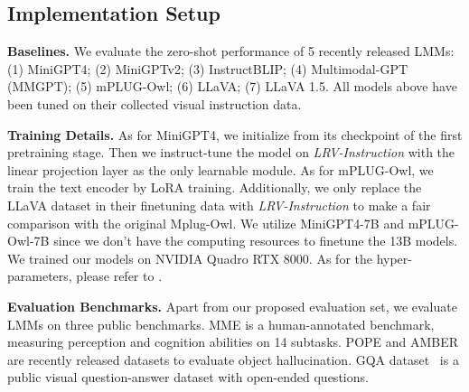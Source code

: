 
\subsection{Implementation Setup}
\vspace{-0.1in}
\textbf{Baselines. }We evaluate the zero-shot performance of 5 recently released LMMs: (1) MiniGPT4; (2) MiniGPTv2; (3) InstructBLIP; (4) Multimodal-GPT (MMGPT); (5) mPLUG-Owl; (6) LLaVA; (7) LLaVA 1.5. All models above have been tuned on their collected visual instruction data. 


\textbf{Training Details. }As for MiniGPT4, we initialize from its checkpoint of the first pretraining stage. Then we instruct-tune the model on \textit{LRV-Instruction} with the linear projection layer as the only learnable module. As for mPLUG-Owl, we train the text encoder by LoRA training. Additionally, we only replace the LLaVA dataset in their finetuning data with \textit{LRV-Instruction} to make a fair comparison with the original Mplug-Owl. We utilize MiniGPT4-7B and mPLUG-Owl-7B since we don’t have the computing resources to finetune the 13B models. We trained our models on NVIDIA Quadro RTX 8000. As for the hyper-parameters, please refer to \citep{zhu2023minigpt, ye2023mplug}.

\textbf{Evaluation Benchmarks. }Apart from our proposed evaluation set, we evaluate LMMs on three public benchmarks. MME \citep{fu2023mme} is a human-annotated benchmark, measuring perception and cognition abilities on 14 subtasks. POPE \citep{li2023evaluating} and AMBER \citep{wang2023llm} are recently released datasets to evaluate object hallucination. GQA dataset~\citep{hudson2019gqa} is a public visual question-answer dataset with open-ended questions.





